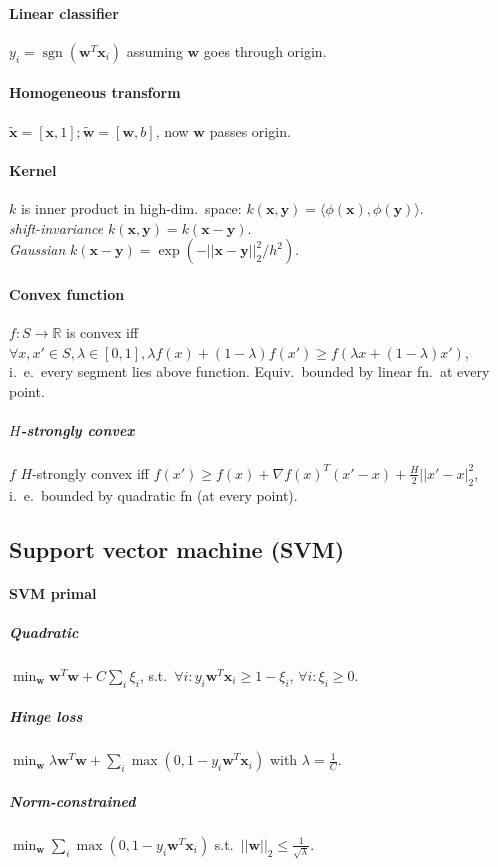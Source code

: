 \documentclass[10pt]{scrartcl}
\DeclareMathOperator{\sign}{sgn}
\newcommand{\R}{\mathbb{R}}
\begin{document}
\begin{multicols}{3}
\paragraph{Linear classifier} $y_i = \sign(\bm w^T\bm x_i)$ assuming $\bm w$ goes through origin.
\paragraph{Homogeneous transform} $\tilde{\bm x} = [\bm x, 1]; \tilde{\bm w} = [\bm w, b]$, now $\bm w$ passes origin.
\paragraph{Kernel}
$k$ is inner product in high-dim.\ space: $k(\bm x,\bm y) = \langle\phi(\bm x),\phi(\bm y)\rangle$.\\
\emph{shift-invariance} $k(\bm x,\bm y) = k(\bm x - \bm y)$. \\
\emph{Gaussian} $k(\bm x - \bm y) = \exp(-||\bm x - \bm y||_2^2/h^2)$.

\paragraph{Convex function} $f: S \rightarrow \R$ is convex iff $\forall x,x'\in S, \lambda \in [0,1], \lambda f(x) + (1-\lambda)f(x') \geq f(\lambda x + (1-\lambda)x')$, i.\ e.\ every segment lies above function. Equiv.\ bounded by linear fn.\ at every point.
\subparagraph{$H$-strongly convex} $f$ $H$-strongly convex iff $f(x') \geq f(x) + \nabla f(x)^T(x'-x)+\frac{H}{2}||x'-x|_2^2$, i.\ e.\ bounded by quadratic fn (at every point).
\subsection{Support vector machine (SVM)}
\paragraph{SVM primal}
\subparagraph{Quadratic} $\min_{\bm w} \bm w^T \bm w + C\sum_{i}\xi_i$,
s.t.\ $\forall i: y_i\bm w^T \bm x_i \geq 1 - \xi_i$, $\forall i: \xi_i\geq 0$.
\subparagraph{Hinge loss}
$\min_{\bm w} \lambda \bm w^T \bm w + \sum_{i}\max(0,1-y_i\bm w^T \bm x_i)$ with $\lambda = \frac{1}{C}$.
\subparagraph{Norm-constrained}
$\min_{\bm w} \sum_{i}\max(0,1-y_i\bm w^T\bm x_i)$ s.t.\ $||\bm w||_2 \leq \frac{1}{\sqrt \lambda}$.

\end{multicols}
\end{document}
